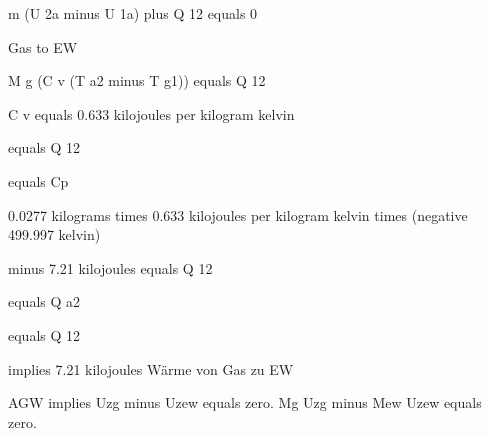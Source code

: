 m (U 2a minus U 1a) plus Q 12 equals 0

Gas to EW

M g (C v (T a2 minus T g1)) equals Q 12

C v equals 0.633 kilojoules per kilogram kelvin

equals Q 12

equals Cp

0.0277 kilograms times 0.633 kilojoules per kilogram kelvin times (negative 499.997 kelvin)

minus 7.21 kilojoules equals Q 12

equals Q a2

equals Q 12

implies 7.21 kilojoules Wärme von Gas zu EW

AGW implies Uzg minus Uzew equals zero. Mg Uzg minus Mew Uzew equals zero.